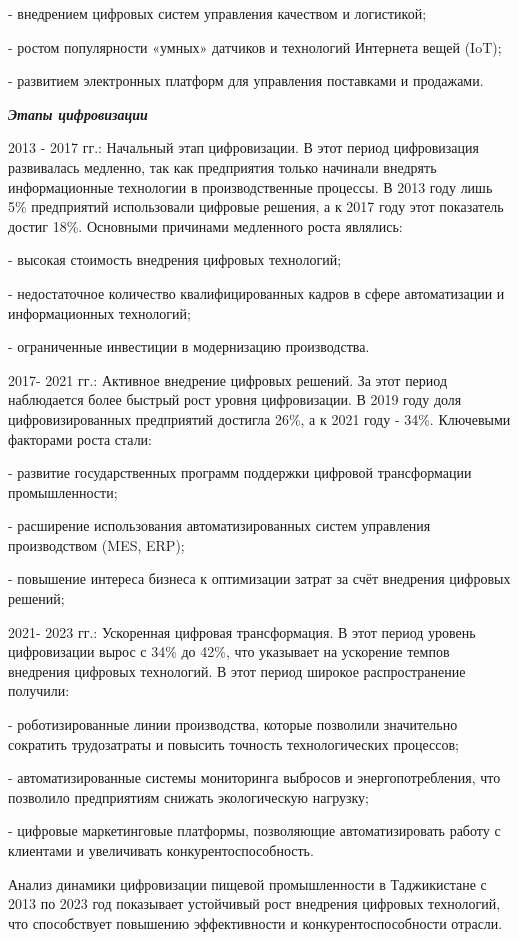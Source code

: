 - внедрением цифровых систем управления качеством и логистикой;

- ростом популярности «умных» датчиков и технологий Интернета вещей
(IoT);

- развитием электронных платформ для управления поставками и продажами.

\emph{{\bfseries Этапы цифровизации}}

2013 - 2017 гг.: Начальный этап цифровизации. В этот период цифровизация
развивалась медленно, так как предприятия только начинали внедрять
информационные технологии в производственные процессы. В 2013 году лишь
5\% предприятий использовали цифровые решения, а к 2017 году этот
показатель достиг 18\%. Основными причинами медленного роста являлись:

- высокая стоимость внедрения цифровых технологий;

- недостаточное количество квалифицированных кадров в сфере
автоматизации и информационных технологий;

- ограниченные инвестиции в модернизацию производства.

2017- 2021 гг.: Активное внедрение цифровых решений. За этот период
наблюдается более быстрый рост уровня цифровизации. В 2019 году доля
цифровизированных предприятий достигла 26\%, а к 2021 году - 34\%.
Ключевыми факторами роста стали:

- развитие государственных программ поддержки цифровой трансформации
промышленности;

- расширение использования автоматизированных систем управления
производством (MES, ERP);

- повышение интереса бизнеса к оптимизации затрат за счёт внедрения
цифровых решений;

2021- 2023 гг.: Ускоренная цифровая трансформация. В этот период уровень
цифровизации вырос с 34\% до 42\%, что указывает на ускорение темпов
внедрения цифровых технологий. В этот период широкое распространение
получили:

- роботизированные линии производства, которые позволили значительно
сократить трудозатраты и повысить точность технологических процессов;

- автоматизированные системы мониторинга выбросов и энергопотребления,
что позволило предприятиям снижать экологическую нагрузку;

- цифровые маркетинговые платформы, позволяющие автоматизировать работу
с клиентами и увеличивать конкурентоспособность.

Анализ динамики цифровизации пищевой промышленности в Таджикистане с
2013 по 2023 год показывает устойчивый рост внедрения цифровых
технологий, что способствует повышению эффективности и
конкурентоспособности отрасли.

